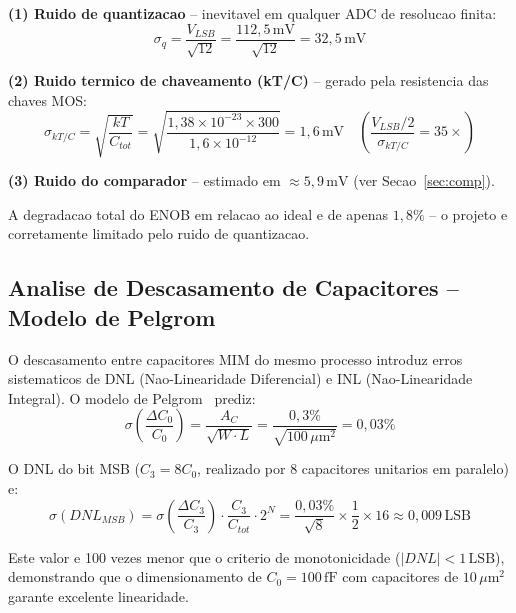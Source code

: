 \documentclass[12pt, a4paper]{article}
\begin{document}
\textbf{(1) Ruido de quantizacao} -- inevitavel em qualquer ADC de resolucao finita:
\begin{equation}
  \sigma_q = \frac{V_{LSB}}{\sqrt{12}} = \frac{112{,}5\,\text{mV}}{\sqrt{12}} = 32{,}5\,\text{mV}
  \label{eq:quant}
\end{equation}

\textbf{(2) Ruido termico de chaveamento (kT/C)} -- gerado pela resistencia das chaves MOS:
\begin{equation}
  \sigma_{kT/C} = \sqrt{\frac{kT}{C_{tot}}} = \sqrt{\frac{1{,}38\times10^{-23}\times300}{1{,}6\times10^{-12}}}
  = 1{,}6\,\text{mV} \quad \left(\frac{V_{LSB}/2}{\sigma_{kT/C}} = 35\times\right)
  \label{eq:ktc}
\end{equation}

\textbf{(3) Ruido do comparador} -- estimado em $\approx 5{,}9\,\text{mV}$ (ver Secao~\ref{sec:comp}).

A degradacao total do ENOB em relacao ao ideal e de apenas $1{,}8\%$ -- o projeto e
corretamente limitado pelo ruido de quantizacao.

\subsection{Analise de Descasamento de Capacitores -- Modelo de Pelgrom}

O descasamento entre capacitores MIM do mesmo processo introduz erros sistematicos de DNL
(Nao-Linearidade Diferencial) e INL (Nao-Linearidade Integral). O modelo de Pelgrom~\cite{pelgrom1989}
prediz:
\begin{equation}
  \sigma\!\left(\frac{\Delta C_0}{C_0}\right) = \frac{A_C}{\sqrt{W\cdot L}}
  = \frac{0{,}3\%}{\sqrt{100\,\mu\text{m}^2}} = 0{,}03\%
  \label{eq:pelgrom}
\end{equation}

O DNL do bit MSB ($C_3 = 8C_0$, realizado por 8 capacitores unitarios em paralelo) e:
\begin{equation}
  \sigma(DNL_{MSB}) = \sigma\!\left(\frac{\Delta C_3}{C_3}\right) \cdot \frac{C_3}{C_{tot}} \cdot 2^N
  = \frac{0{,}03\%}{\sqrt{8}} \times \frac{1}{2} \times 16 \approx 0{,}009\,\text{LSB}
  \label{eq:dnl}
\end{equation}

Este valor e 100 vezes menor que o criterio de monotonicidade ($|DNL| < 1\,\text{LSB}$),
demonstrando que o dimensionamento de $C_0 = 100\,\text{fF}$ com capacitores de $10\,\mu\text{m}^2$
garante excelente linearidade.
\end{document}
